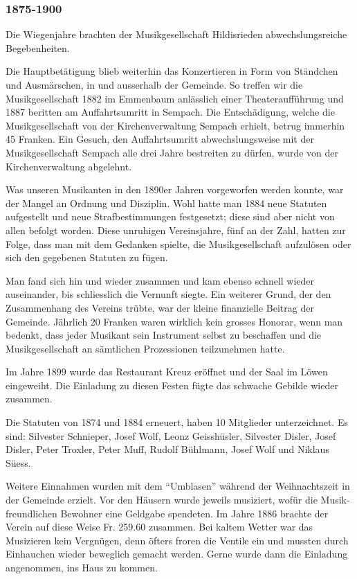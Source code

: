 \begin{history}

    \subsubsection*{1875-1900}

    Die Wiegenjahre brachten der Musikgesellschaft Hildisrieden
    abwechslungsreiche Begebenheiten.

    Die Hauptbetätigung blieb weiterhin das Konzertieren in Form von Ständchen
    und Ausmärschen, in und ausserhalb der Gemeinde. So treffen wir die
    Musikgesellschaft 1882 im Emmenbaum anlässlich einer Theateraufführung und
    1887 beritten am Auffahrtsumritt in Sempach. Die Entschädigung, welche die
    Musikgesellschaft von der Kirchenverwaltung Sempach erhielt, betrug immerhin
    45 Franken. Ein Gesuch, den Auffahrtsumritt abwechslungsweise mit der
    Musikgesellschaft Sempach alle drei Jahre bestreiten zu dürfen, wurde von
    der Kirchenverwaltung abgelehnt.

    Was unseren Musikanten in den 1890er Jahren vorgeworfen werden konnte, war
    der Mangel an Ordnung  und Disziplin. Wohl hatte man 1884 neue Statuten
    aufgestellt und neue Strafbestimmungen festgesetzt; diese sind aber nicht
    von allen befolgt worden. Diese unruhigen Vereinsjahre, fünf an der Zahl,
    hatten zur Folge, dass man mit dem Gedanken spielte, die Musikgesellschaft
    aufzulösen oder sich den gegebenen Statuten zu fügen.

    Man fand sich hin und wieder zusammen und kam ebenso schnell wieder
    auseinander, bis schliesslich die Vernunft siegte. Ein weiterer Grund, der
    den Zusammenhang des Vereins trübte, war der kleine finanzielle Beitrag der
    Gemeinde. Jährlich 20 Franken waren wirklich kein grosses Honorar, wenn man
    bedenkt, dass jeder Musikant sein Instrument selbst zu beschaffen und die
    Musikgesellschaft an sämtlichen Prozessionen teilzunehmen hatte.

    Im Jahre 1899 wurde das Restaurant Kreuz eröffnet und der Saal im Löwen
    eingeweiht. Die Einladung zu diesen Festen fügte das schwache Gebilde wieder
    zusammen.

    Die Statuten von 1874 und 1884 erneuert, haben 10 Mitglieder unterzeichnet.
    Es sind: Silvester Schnieper, Josef Wolf, Leonz Geisshüsler, Silvester
    Disler, Josef Disler, Peter Troxler, Peter Muff, Rudolf Bühlmann, Josef Wolf
    und Niklaus Süess.

    Weitere Einnahmen wurden mit dem \enquote{Umblasen}  während der
    Weihnachtszeit in der Gemeinde erzielt. Vor den Häusern wurde jeweils
    musiziert, wofür die Musik-freundlichen Bewohner eine Geldgabe spendeten. Im
    Jahre 1886 brachte der Verein auf diese Weise Fr. 259.60 zusammen. Bei
    kaltem Wetter war das Musizieren kein Vergnügen, denn öfters froren die
    Ventile ein und mussten durch Einhauchen wieder beweglich gemacht werden.
    Gerne wurde dann die Einladung angenommen, ins Haus zu kommen.


\end{history}
